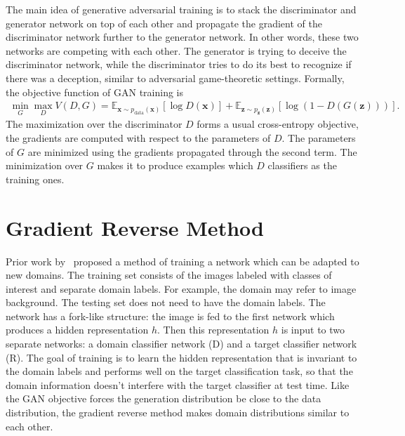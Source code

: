 \documentclass{article}
\begin{document}
    The main idea of generative adversarial
    training is to stack the discriminator and generator network on top of each other and propagate the gradient of the discriminator
    network further to the generator network. In other words, these two networks are competing with each other. The 
    generator is trying to deceive the discriminator network, while the discriminator tries
    to do its best to recognize if there was a deception, similar to adversarial game-theoretic settings.    
    Formally, the objective function of GAN training is
    \begin{align*}
        \min_G \max_D V(D, G) = \mathbb{E}_{\bm{x} \sim p_{\text{data}}(\bm{x})}[\log D(\bm{x})] + 
            \mathbb{E}_{\bm{z} \sim p_{\bm{z}}(\bm{z})}[\log (1 - D(G(\bm{z})))].
    \end{align*}
    The maximization over the discriminator $D$ forms a usual cross-entropy objective, the gradients are
    computed with respect to the parameters of $D$. The parameters of $G$ are minimized using the gradients
    propagated through the second term. The minimization over $G$ makes it to produce examples which $D$
    classifiers as the training ones.
    
\section{Gradient Reverse Method}
\label{sec:gradient-reverse}

    Prior work by~\cite{ganin2014unsupervised} proposed a method of training a network 
    which can be adapted to new domains. The training set consists of the images
    labeled with classes of interest and separate domain labels. For example, the domain may refer to image background. The testing set does not need
    to have the domain labels. The network has a fork-like structure: the image is fed to the
    first network which produces a hidden representation $h$. Then this representation $h$ is input to two separate networks: a domain classifier network (D) and 
    a target classifier network (R). The goal of training is to learn the hidden 
    representation that is invariant to the domain labels and performs well on the target classification task, so that the domain information doesn't 
    interfere with the target classifier at test time. Like the GAN objective forces the generation distribution be close to the data distribution,
    the gradient reverse method makes domain distributions similar to each other.
\end{document}

